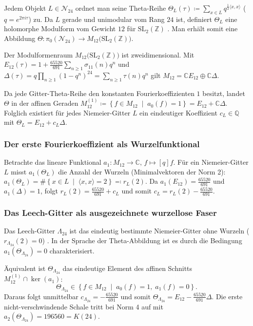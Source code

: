 \documentclass[11pt,a4paper]{article}
\begin{document}
	Jedem Objekt $L \in \mathscr{N}_{24}$ ordnet man seine Theta-Reihe $\Theta_L(\tau) \coloneqq \sum_{x\in L} q^{\frac12\langle x,x\rangle}$ ($q=e^{2\pi i\tau}$) zu. Da $L$ gerade und unimodular vom Rang $24$ ist, definiert $\Theta_L$ eine holomorphe Modulform vom Gewicht $12$ für $\mathrm{SL}_2(\mathbb{Z})$ \cite{serre}. Man erhält somit eine Abbildung $\Theta \colon \pi_0(\mathscr{N}_{24}) \longrightarrow M_{12}\bigl(\mathrm{SL}_2(\mathbb{Z})\bigr)$.
	
	Der Modulformenraum $M_{12}\bigl(\mathrm{SL}_2(\mathbb{Z})\bigr)$ ist zweidimensional. Mit $E_{12}(\tau) = 1 + \frac{65520}{691} \sum_{n\geq 1}\sigma_{11}(n)q^n$ und $\Delta(\tau) = q\prod_{n\geq 1}(1-q^n)^{24} = \sum_{n\geq 1}\tau(n)q^n$ gilt $M_{12} = \mathbb{C} E_{12} \oplus \mathbb{C}\Delta$.
	
	Da jede Gitter-Theta-Reihe den konstanten Fourierkoeffizienten $1$ besitzt, landet $\Theta$ in der affinen Geraden $M_{12}^{(1)} \coloneqq \left\{ f\in M_{12} \;\middle|\; a_0(f)=1 \right\} = E_{12} + \mathbb{C}\Delta$. Folglich existiert für jedes Niemeier-Gitter $L$ ein eindeutiger Koeffizient $c_L\in\mathbb{Q}$ mit $\Theta_L = E_{12} + c_L\Delta$.
	
	\subsubsection{Der erste Fourierkoeffizient als Wurzelfunktional}
	Betrachte das lineare Funktional $a_1 \colon M_{12} \to \mathbb{C}, \, f \mapsto [q]f$. Für ein Niemeier-Gitter $L$ misst $a_1(\Theta_L)$ die Anzahl der Wurzeln (Minimalvektoren der Norm 2):
	$a_1(\Theta_L) = \#\left\{ x\in L \;\middle|\; \langle x,x\rangle=2 \right\} \eqqcolon r_L(2)$. Da $a_1(E_{12})=\frac{65520}{691}$ und $a_1(\Delta)=1$, folgt $r_L(2) = \frac{65520}{691}+c_L$ und somit $c_L = r_L(2) - \frac{65520}{691}$.
	
	\subsubsection{Das Leech-Gitter als ausgezeichnete wurzellose Faser}
	Das Leech-Gitter $\Lambda_{24}$ ist das eindeutig bestimmte Niemeier-Gitter ohne Wurzeln ($r_{\Lambda_{24}}(2) = 0$) \cite{conway}. In der Sprache der Theta-Abbildung ist es durch die Bedingung $a_1(\Theta_{\Lambda_{24}})=0$ charakterisiert.
	
	Äquivalent ist $\Theta_{\Lambda_{24}}$ das eindeutige Element des affinen Schnitts $M_{12}^{(1)} \cap \ker(a_1)$:
	\begin{equation}
		\Theta_{\Lambda_{24}} \in \left\{ f\in M_{12} \;\middle|\; a_0(f)=1,\; a_1(f)=0 \right\}.
	\end{equation}
	Daraus folgt unmittelbar $c_{\Lambda_{24}} = -\frac{65520}{691}$ und somit $\Theta_{\Lambda_{24}} = E_{12} - \frac{65520}{691}\Delta$. Die erste nicht-verschwindende Schale tritt bei Norm 4 auf mit $a_2(\Theta_{\Lambda_{24}}) = 196560 = K(24)$.
	
\end{document}
